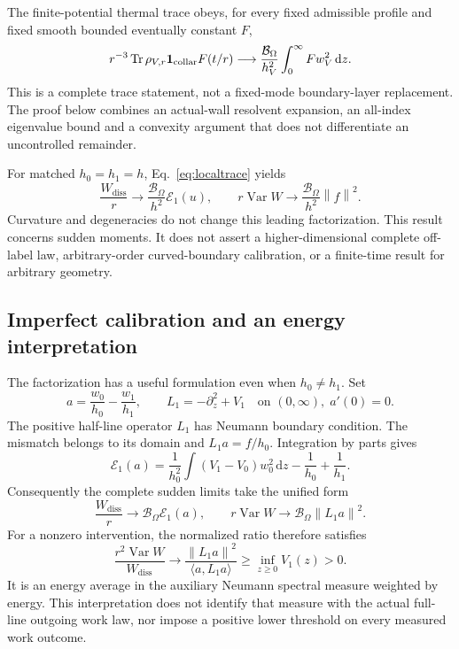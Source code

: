 \documentclass[aps,pra,reprint,superscriptaddress,longbibliography]{revtex4-2}
\newcommand{\dd}{\mathrm d}
\newcommand{\Tr}{\operatorname{Tr}}
\newcommand{\Var}{\operatorname{Var}}
\newcommand{\Wd}{W_{\mathrm{diss}}}
\newcommand{\calE}{\mathcal E}
\newcommand{\calB}{\mathcal B}
\newcommand{\norm}[1]{\left\lVert#1\right\rVert}
\begin{document}
The finite-potential thermal trace obeys, for every fixed admissible profile and fixed smooth bounded eventually constant $F$,
\begin{equation}
 r^{-3}\Tr\rho_{V,r}\mathbf1_{\rm collar}F(t/r)
   \longrightarrow\frac{\calB_\Omega}{h_V^2}
             \int_0^\infty Fw_V^2\,\dd z.\label{eq:localtrace}
\end{equation}
This is a complete trace statement, not a fixed-mode boundary-layer replacement. The proof below combines an actual-wall resolvent expansion, an all-index eigenvalue bound and a convexity argument that does not differentiate an uncontrolled remainder.

For matched $h_0=h_1=h$, Eq.~\eqref{eq:localtrace} yields
\begin{equation}
 \frac{\Wd}{r}\longrightarrow\frac{\calB_\Omega}{h^2}\calE_1(u),
 \qquad r\Var W\longrightarrow\frac{\calB_\Omega}{h^2}\norm f^2.
 \label{eq:geometricwork}
\end{equation}
Curvature and degeneracies do not change this leading factorization. This result concerns sudden moments. It does not assert a higher-dimensional complete off-label law, arbitrary-order curved-boundary calibration, or a finite-time result for arbitrary geometry.

\subsection{Imperfect calibration and an energy interpretation}

The factorization has a useful formulation even when $h_0\ne h_1$. Set
\begin{equation}
 a=\frac{w_0}{h_0}-\frac{w_1}{h_1},\qquad
 L_1=-\partial_z^2+V_1\quad\text{on }(0,\infty),\; a'(0)=0.
 \label{eq:neumannmismatch}
\end{equation}
The positive half-line operator $L_1$ has Neumann boundary condition. The mismatch belongs to its domain and $L_1a=f/h_0$. Integration by parts gives
\begin{equation}
 \calE_1(a)=\frac1{h_0^2}\int(V_1-V_0)w_0^2\,\dd z
                          -\frac1{h_0}+\frac1{h_1}.\label{eq:unmatchedenergy}
\end{equation}
Consequently the complete sudden limits take the unified form
\begin{equation}
 \frac{\Wd}{r}\to\calB_\Omega\calE_1(a),\qquad
 r\Var W\to\calB_\Omega\norm{L_1a}^2.\label{eq:unified}
\end{equation}
For a nonzero intervention, the normalized ratio therefore satisfies
\begin{equation}
 \frac{r^2\Var W}{\Wd}\longrightarrow
 \frac{\norm{L_1a}^2}{\langle a,L_1a\rangle}
                       \ge\inf_{z\ge0}V_1(z)>0.
 \label{eq:ratio}
\end{equation}
It is an energy average in the auxiliary Neumann spectral measure weighted by energy. This interpretation does not identify that measure with the actual full-line outgoing work law, nor impose a positive lower threshold on every measured work outcome.
\end{document}
